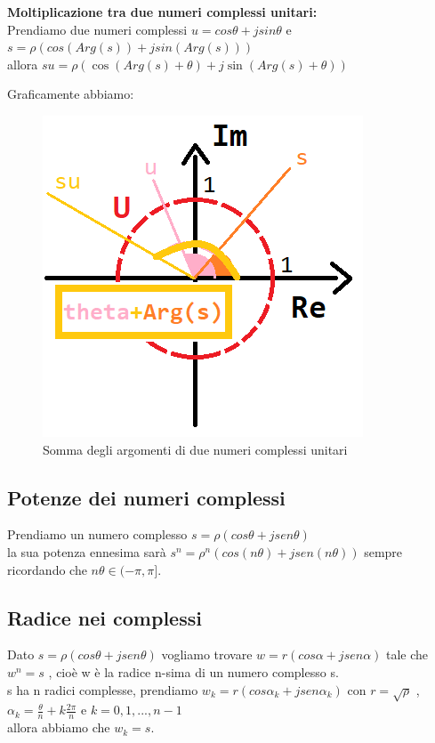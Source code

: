 \textbf{Moltiplicazione tra due numeri complessi unitari:} \\
Prendiamo due numeri complessi $ u = cos\theta +j sin\theta $ e $ s = \rho ( cos( Arg(s) ) + j sin ( Arg(s) ) ) $ \\
allora $ s u = \rho ( \cos ( Arg(s) + \theta) + j \sin (Arg(s) + \theta) ) $

Graficamente abbiamo:
\begin{figure}[h]
	\centering
	\includegraphics[scale=0.5]{immagini/ComplessiUnitariMoltiplicazioni}
	\caption{ Somma degli argomenti di due numeri complessi unitari }
	\label{fig: complesso unitari moltiplicazioni}
\end{figure}

\subsection*{Potenze dei numeri complessi}
Prendiamo un numero complesso $ s = \rho (cos\theta + j sen\theta) $ \\
la sua potenza ennesima sarà $ s^{n} = \rho^{n} (cos(n\theta) + j sen(n\theta ) ) $ sempre ricordando che $n\theta \in (-\pi , \pi ]$.

\subsection*{Radice nei complessi}

Dato $ s = \rho (cos\theta + j sen\theta) $ vogliamo trovare $ w = r (cos\alpha + j sen \alpha )$ tale che $ w^{n} = s$ , cioè w è la radice n-sima di un numero complesso s. \\
s ha n radici complesse, prendiamo $ w_{k} = r (cos\alpha_{k} + j sen \alpha_{k} ) $ con $r = \sqrt{\rho}$ , $ \alpha_{k} = \frac{\theta}{ n} + k \frac{2 \pi}{n} $ e $ k = 0,1,...,n-1$ \\
allora abbiamo che $ w_{k} = s$. \\

